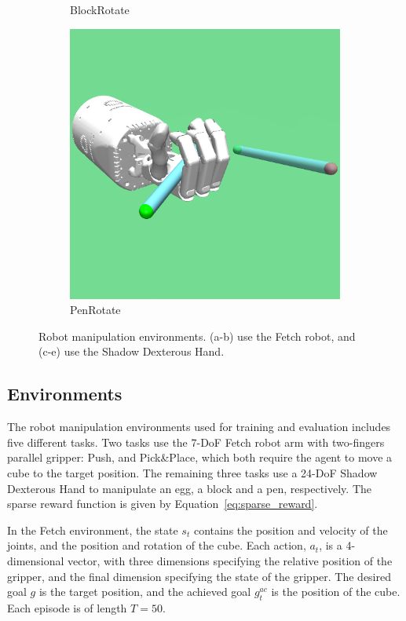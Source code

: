 \begin{figure}
\begin{subfigure}[t]{0.19\textwidth}
    \caption{BlockRotate}
    \label{subfig:env_handblock}
  \end{subfigure}\hfill
  \begin{subfigure}[t]{0.19\textwidth}
    \includegraphics[width=\textwidth]{figures/chapter4/handpen_resize.png}
    \caption{PenRotate}
    \label{subfig:env_handpen}
  \end{subfigure}\hfill
  \caption[Evaluation environments of DTGSH.]{Robot manipulation environments. (a-b) use the Fetch robot, and (c-e) use the Shadow Dexterous Hand.} 
  \label{fig:env_c4}
\end{figure}

\subsection{Environments}
The robot manipulation environments used for training and evaluation includes five different tasks. Two tasks use the 7-DoF Fetch robot arm with two-fingers parallel gripper: Push, and Pick\&Place, which both require the agent to move a cube to the target position. The remaining three tasks use a 24-DoF Shadow Dexterous Hand to manipulate an egg, a block and a pen, respectively. The sparse reward function is given by Equation~\eqref{eq:sparse_reward}.

In the Fetch environment, the state $s_{t}$ contains the position and velocity of the joints, and the position and rotation of the cube. Each action, $a_{t}$, is a 4-dimensional vector, with three dimensions specifying the relative position of the gripper, and the final dimension specifying the state of the gripper. The desired goal $g$ is the target position, and the achieved goal $g^{ac}_{t}$ is the position of the cube. Each episode is of length $T = 50$.

